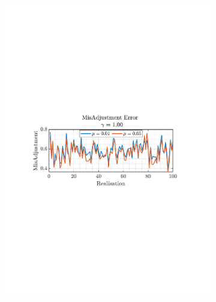 \documentclass[12pt]{article}
\begin{document}
\begin{figure}[H]
				\begin{subfigure}{0.49\textwidth}
					\centering
					\includegraphics[trim={2.2cm 11.2cm 3.00cm  11.2cm}, clip, width=\textwidth]{../MATLAB/figures/q2_1f_fig07.pdf} 
					\captionsetup{justification=centering}
				\end{subfigure}
				\begin{subfigure}{0.49\textwidth}
					\centering

\end{subfigure}
\end{figure}
\end{document}
